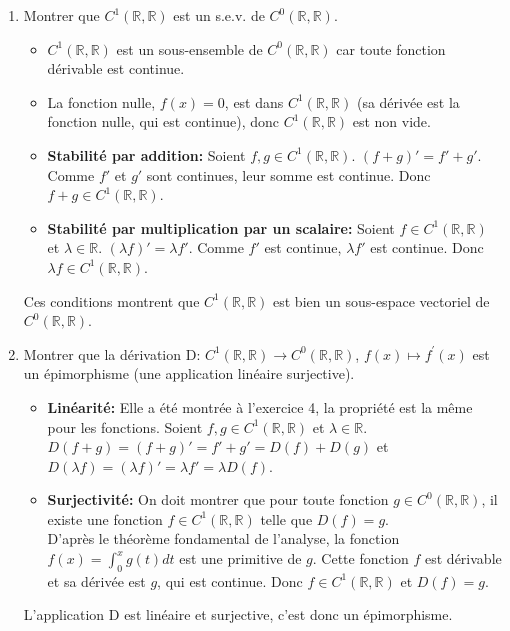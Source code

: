 \documentclass[french]{yLectureNote}
\begin{document}
\begin{enumerate}
    \item Montrer que $C^{1}(\mathbb{R},\mathbb{R})$ est un s.e.v. de $C^{0}(\mathbb{R},\mathbb{R})$.
    \begin{itemize}
        \item $C^{1}(\mathbb{R},\mathbb{R})$ est un sous-ensemble de $C^{0}(\mathbb{R},\mathbb{R})$ car toute fonction dérivable est continue.
        \item La fonction nulle, $f(x)=0$, est dans $C^{1}(\mathbb{R},\mathbb{R})$ (sa dérivée est la fonction nulle, qui est continue), donc $C^{1}(\mathbb{R},\mathbb{R})$ est non vide.
        \item \textbf{Stabilité par addition:} Soient $f,g \in C^{1}(\mathbb{R},\mathbb{R})$. $(f+g)' = f'+g'$. Comme $f'$ et $g'$ sont continues, leur somme est continue. Donc $f+g \in C^{1}(\mathbb{R},\mathbb{R})$.
        \item \textbf{Stabilité par multiplication par un scalaire:} Soient $f \in C^{1}(\mathbb{R},\mathbb{R})$ et $\lambda \in \mathbb{R}$. $(\lambda f)' = \lambda f'$. Comme $f'$ est continue, $\lambda f'$ est continue. Donc $\lambda f \in C^{1}(\mathbb{R},\mathbb{R})$.
    \end{itemize}
    Ces conditions montrent que $C^{1}(\mathbb{R},\mathbb{R})$ est bien un sous-espace vectoriel de $C^{0}(\mathbb{R},\mathbb{R})$.

    \item Montrer que la dérivation D: $C^{1}(\mathbb{R},\mathbb{R})\rightarrow C^{0}(\mathbb{R},\mathbb{R})$, $f(x)\mapsto f^{\prime}(x)$ est un épimorphisme (une application linéaire surjective).
    \begin{itemize}
        \item \textbf{Linéarité:} Elle a été montrée à l'exercice 4, la propriété est la même pour les fonctions. Soient $f,g \in C^{1}(\mathbb{R},\mathbb{R})$ et $\lambda \in \mathbb{R}$. $D(f+g)=(f+g)'=f'+g'=D(f)+D(g)$ et $D(\lambda f)=(\lambda f)'=\lambda f'=\lambda D(f)$.
        \item \textbf{Surjectivité:} On doit montrer que pour toute fonction $g \in C^{0}(\mathbb{R},\mathbb{R})$, il existe une fonction $f \in C^{1}(\mathbb{R},\mathbb{R})$ telle que $D(f)=g$. \\
        D'après le théorème fondamental de l'analyse, la fonction $f(x)=\int_0^x g(t)dt$ est une primitive de $g$. Cette fonction $f$ est dérivable et sa dérivée est $g$, qui est continue. Donc $f \in C^{1}(\mathbb{R},\mathbb{R})$ et $D(f)=g$.
    \end{itemize}
    L'application D est linéaire et surjective, c'est donc un épimorphisme.
\end{enumerate}
\end{document}
